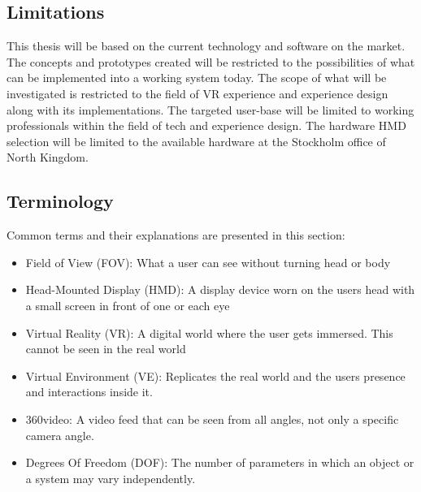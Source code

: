 \subsection{Limitations}
This thesis will be based on the current technology and software on the market. The concepts and prototypes created will be restricted to the possibilities of what can be implemented into a working system today. The scope of what will be investigated is restricted to the field of VR experience and experience design along with its implementations. The targeted user-base will be limited to working professionals within the field of tech and experience design. The hardware HMD selection will be limited to the available hardware at the Stockholm office of North Kingdom.

\subsection{Terminology}
  Common terms and their explanations are presented in this section:
  \begin{itemize}
		\item Field of View (FOV): What a user can see without turning head or body
	  \item Head-Mounted Display (HMD): A display device worn on the users head with a small screen in front of one or each eye
	  \item Virtual Reality (VR): A digital world where the user gets immersed. This cannot be seen in the real world
		\item Virtual Environment (VE): Replicates the real world and the users presence and interactions inside it.
	  \item 360\degree video: A video feed that can be seen from all angles, not only a specific camera angle.
		\item Degrees Of Freedom (DOF): The number of parameters in which an object or a system may vary independently.
	\end{itemize}

